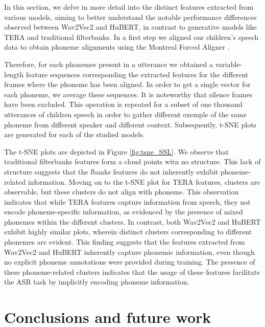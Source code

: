 In this section, we delve in more detail into the distinct features extracted from various models, aiming to better understand the notable performance differences observed between Wav2Vec2 and HuBERT, in contrast to generative models like TERA and traditional filterbanks. In a first step we aligned our children's speech data to obtain phoneme alignments using the Montreal Forced Aligner \cite{mcauliffe2017montreal}. %

Therefore, for each phonemes present in a utterance we obtained a variable-length feature sequences corresponding the extracted features for the different frames where the phoneme has been aligned. In order to get a single vector for each phoneme, we average these sequences. It is noteworthy that silence frames have been excluded. This operation is repeated for a subset of one thousand utterances of children speech in order to gather different exemple of the same phoneme from different speaker and different context. Subsequently, \ac{t-SNE} plots are generated for each of the studied models. 

The \ac{t-SNE} plots are depicted in Figure \ref{fig:tsne_SSL}. We observe that traditional filterbanks features form a cloud points witn no structure. This lack of structure suggests that the \ac{fbanks} features do not inherently exhibit phoneme-related information.
Moving on to the \ac{t-SNE} plot for TERA features, clusters are observable, but these clusters do not align with phoneme. This observation indicates that while TERA features capture information from speech, they not encode phoneme-specific information, as evidenced by the presence of mixed phonemes within the different clusters.
In contrast, both Wav2Vec2 and HuBERT exhibit highly similar plots, wherein distinct clusters corresponding to different phonemes are evident. This finding suggests that the features extracted from Wav2Vec2 and HuBERT inherently capture phonemic information, even though no explicit phoneme annotations were provided during training. The presence of these phoneme-related clusters indicates that the usage of these features facilitate the \ac{ASR} task by implicitly encoding phoneme information.



\section{Conclusions and future work}

